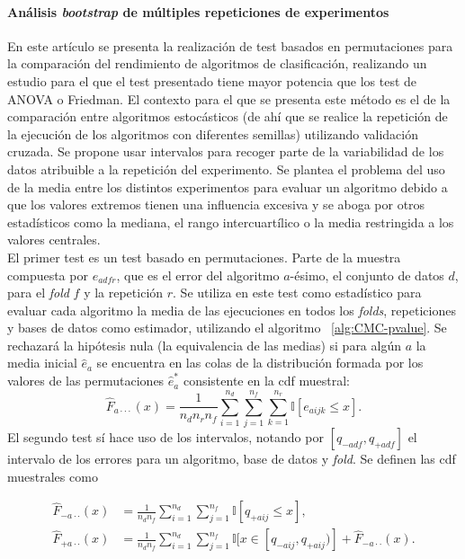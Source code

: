 	\paragraph{Análisis \textit{bootstrap} de múltiples repeticiones de experimentos} \cite{OTERO13} En este artículo se presenta la realización de test basados en permutaciones para la comparación del rendimiento de algoritmos de clasificación, realizando un estudio para el que el test presentado tiene mayor potencia que los test de ANOVA o Friedman. El contexto para el que se presenta este método es el de la comparación entre algoritmos estocásticos (de ahí que se realice la repetición de la ejecución de los algoritmos con diferentes semillas) utilizando validación cruzada. Se propone usar intervalos para recoger parte de la variabilidad de los datos atribuible a la repetición del experimento. Se plantea el problema del uso de la media entre los distintos experimentos para evaluar un algoritmo debido a que los valores extremos tienen una influencia excesiva y se aboga por otros estadísticos como la mediana, el rango intercuartílico o la media restringida a los valores centrales.\\
	El primer test es un test basado en permutaciones. Parte de la muestra compuesta por $e_{adfr}$, que es el error del algoritmo $a$-ésimo, el conjunto de datos $d$, para el \textit{fold} $f$ y la repetición $r$. Se utiliza en este test como estadístico para evaluar cada algoritmo la media de las ejecuciones en todos los \textit{folds}, repeticiones y bases de datos como estimador, utilizando el algoritmo ~\ref{alg:CMC-pvalue}. Se rechazará la hipótesis nula (la equivalencia de las medias) si para algún $a$ la media inicial $\hat{e}_a$ se encuentra en las colas de la distribución formada por los valores de las permutaciones $\hat{e}_a^*$ consistente en la cdf muestral:
	\[ 
		\hat{F}_{a \cdot \cdot \cdot}(x) =
			\frac{1}{n_d n_r n_f}
			\sum\limits_{i=1}^{n_d}
				\sum\limits_{j=1}^{n_f}
					\sum\limits_{k=1}^{n_r}
						\mathbb{I}[ e_{aijk} \leq x ].
	\]
	El segundo test sí hace uso de los intervalos, notando por $[q_{-adf}, q_{+adf}]$ el intervalo de los errores para un algoritmo, base de datos y \textit{fold}. Se definen las cdf muestrales como
	
\begin{align*}
	\hat{F}_{-a \cdot \cdot}(x) &=
		\frac{1}{n_d n_f}
			\sum\limits_{i=1}^{n_d}
				\sum\limits_{j=1}^{n_f}
					\mathbb{I}[ q_{+aij} \leq x ], \\
	\hat{F}_{+a \cdot \cdot}(x) &=
		\frac{1}{n_d n_f}
			\sum\limits_{i=1}^{n_d}
				\sum\limits_{j=1}^{n_f}
					\mathbb{I}[ x \in [q_{-aij},q_{+aij}) ] +
			\hat{F}_{-a \cdot \cdot}(x) .			
\end{align*}

